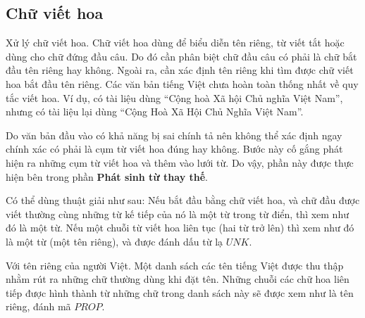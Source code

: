 \documentclass[a4paper,oneside]{book} %
\theoremstyle{break}
\newtheorem{algo}{Thuật toán}
\begin{document}
\subsection{Chữ viết hoa}

Xử lý chữ viết hoa. Chữ viết hoa dùng để biểu diễn tên riêng, từ viết
tắt hoặc dùng cho chữ đứng đầu câu. Do đó cần phân biệt chữ đầu câu có
phải là chữ bắt đầu tên riêng hay không. Ngoài ra, cần xác định tên riêng khi
tìm được chữ viết hoa bắt đầu tên riêng. Các văn bản tiếng Việt chưa
hoàn toàn thống nhất về quy tắc viết hoa. Ví dụ, có tài liệu dùng
``Cộng hoà Xã hội Chủ nghĩa Việt Nam'', nhưng có tài liệu lại dùng
``Cộng Hoà Xã Hội Chủ Nghĩa Việt Nam''.

Do văn bản đầu vào có khả năng bị sai chính tả nên không thể xác định
ngay chính xác có phải là cụm từ viết hoa đúng hay không. Bước này cố
gắng phát hiện ra những cụm từ viết hoa và thêm vào lưới từ. Do vậy,
phần này được thực hiện bên trong phần \textbf{Phát sinh từ thay thế}. 

Có thể dùng thuật giải như sau: Nếu bắt đầu bằng chữ viết hoa, và chữ
đầu được viết thường cùng những từ kế tiếp của nó là một từ trong từ
điển, thì xem như đó là một từ. Nếu một chuỗi từ viết hoa liên tục
(hai từ trở lên) thì xem như đó là một từ (một tên riêng), và được
đánh dấu từ lạ $UNK$.

Với tên riêng của người Việt. Một danh sách các tên tiếng Việt được
thu thập nhằm rút ra những chữ thường dùng khi đặt tên. Những chuỗi
các chữ hoa liên tiếp được hình thành từ những chữ trong danh sách này
sẽ được xem như là tên riêng, đánh mã $PROP$.


\end{document}

